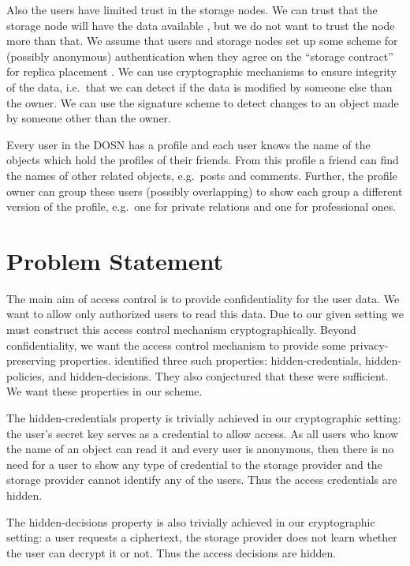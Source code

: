 Also the users have limited trust in the storage nodes.
We can trust that the storage node will have the data available 
\cite{dataavailability,replicaplacement}, but we do not want to trust the node 
more than that.
We assume that users and storage nodes set up some scheme for (possibly 
anonymous) authentication when they agree on the \enquote{storage contract} for 
replica placement \cite{replicaplacement}.
We can use cryptographic mechanisms to ensure integrity of the data, i.e.~that 
we can detect if the data is modified by someone else than the owner.
We can use the signature scheme to detect changes to an object made by someone 
other than the owner.

Every user in the \ac{DOSN} has a profile and each user knows the name of the 
objects which hold the profiles of their friends.
From this profile a friend can find the names of other related objects, 
e.g.~posts and comments.
Further, the profile owner can group these users (possibly overlapping) to show 
each group a different version of the profile, e.g.~one for private relations 
and one for professional ones.


\section{Problem Statement}\label{sec:ProblemStatement}

The main aim of access control is to provide confidentiality for the user data.
We want to allow only authorized users to read this data.
Due to our given setting we must construct this access control mechanism 
cryptographically.
Beyond confidentiality, we want the access control mechanism to provide some 
privacy-preserving properties.
\citet{ppac} identified three such properties: hidden-credentials, 
hidden-policies, and hidden-decisions.
They also conjectured that these were sufficient.
We want these properties in our scheme.

The hidden-credentials property is trivially achieved in our cryptographic 
setting: the user's secret key serves as a credential to allow access.
As all users who know the name of an object can read it and every user is 
anonymous, then there is no need for a user to show any type of credential to 
the storage provider and the storage provider cannot identify any of the users.
Thus the access credentials are hidden.

The hidden-decisions property is also trivially achieved in our cryptographic 
setting: a user requests a ciphertext, the storage provider does not learn 
whether the user can decrypt it or not.
Thus the access decisions are hidden.

